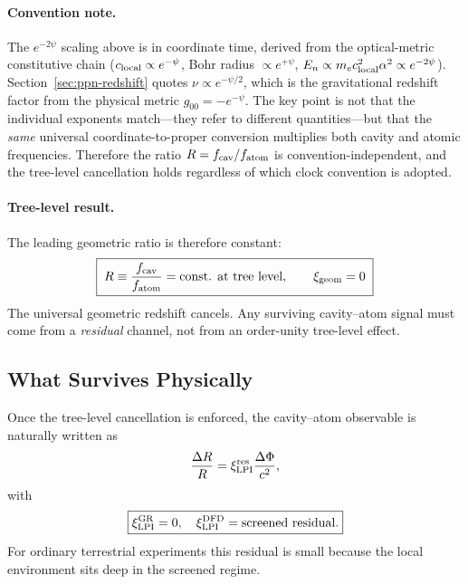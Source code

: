 \paragraph{Convention note.}
The $e^{-2\psi}$ scaling above is in coordinate time, derived from the optical-metric constitutive chain ($c_{\rm local}\propto e^{-\psi}$, Bohr radius $\propto e^{+\psi}$, $E_n \propto m_e c_{\rm local}^2\alpha^2 \propto e^{-2\psi}$).  Section~\ref{sec:ppn-redshift} quotes $\nu\propto e^{-\psi/2}$, which is the gravitational redshift factor from the physical metric $g_{00}=-e^{-\psi}$.  The key point is not that the individual exponents match---they refer to different quantities---but that the \emph{same} universal coordinate-to-proper conversion multiplies both cavity and atomic frequencies.  Therefore the ratio $R = f_{\rm cav}/f_{\rm atom}$ is convention-independent, and the tree-level cancellation holds regardless of which clock convention is adopted.

\paragraph{Tree-level result.}
The leading geometric ratio is therefore constant:
\begin{equation}\label{eq:ratio-cancel}
\boxed{\;R\equiv \frac{f_{\rm cav}}{f_{\rm atom}}=\text{const. at tree level},\qquad \xi_{\rm geom}=0\;}
\end{equation}
The universal geometric redshift cancels.  Any surviving cavity--atom signal must come from a \emph{residual} channel, not from an order-unity tree-level effect.

\subsection{What Survives Physically}\label{sec:cavity-residual}

Once the tree-level cancellation is enforced, the cavity--atom observable is naturally written as
\begin{equation}\label{eq:cavity-atom-slope}
\frac{\Delta R}{R}=\xi_{\rm LPI}^{\rm res}\frac{\Delta\Phi}{c^2},
\end{equation}
with
\begin{equation}\label{eq:xi-prediction}
\boxed{\xi_{\rm LPI}^{\rm GR}=0,\quad \xi_{\rm LPI}^{\rm DFD}=\text{screened residual}.}
\end{equation}
For ordinary terrestrial experiments this residual is small because the local environment sits deep in the screened regime.

